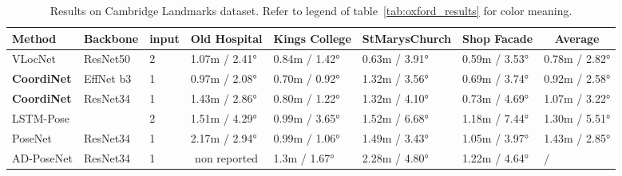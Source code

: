\documentclass[10pt,twocolumn,letterpaper]{article}
\begin{document}
\begin{table*}[!t]
\footnotesize
\centering

\caption{\label{tab:cambridge_results}Results on Cambridge Landmarks dataset. Refer to legend of table~\ref{tab:oxford_results} for color meaning.}

\vspace{0.4cm}

\begin{tabular}{|l|l|l|l|l|l|l|l|}
\hline
\textbf{Method}    & \textbf{Backbone} & \textbf{input} & \multicolumn{1}{c|}{\textbf{Old Hospital}} & \textbf{Kings College}                & \textbf{StMarysChurch}                & \textbf{Shop Facade}                  & \multicolumn{1}{c|}{\textbf{Average}} \\ \hline
VLocNet            & ResNet50          & 2              & 1.07m / 2.41°                              & 0.84m / 1.42°                         & \cellcolor[HTML]{92D050}0.63m / 3.91° & \cellcolor[HTML]{92D050}0.59m / 3.53° & \cellcolor[HTML]{92D050}0.78m / 2.82° \\ \hline
\rowcolor[HTML]{E7E6E6} 
\textbf{CoordiNet} & EffNet b3         & 1              & \cellcolor[HTML]{92D050}0.97m / 2.08°      & \cellcolor[HTML]{92D050}0.70m / 0.92° & 1.32m / 3.56° & 0.69m / 3.74°  & \cellcolor[HTML]{92D050}0.92m / 2.58° \\ \hline
\rowcolor[HTML]{E7E6E6} 
\textbf{CoordiNet} & ResNet34          & 1              & 1.43m / 2.86° & 0.80m / 1.22°                                & 1.32m / 4.10°                                 & 0.73m / 4.69°                                 &  1.07m / 3.22°                                      \\ \hline
LSTM-Pose          &                   & 2              & 1.51m / 4.29°                              & 0.99m / 3.65°                         & 1.52m / 6.68°                         & 1.18m / 7.44°                         & 1.30m / 5.51°                         \\ \hline
PoseNet            & ResNet34          & 1              & 2.17m / 2.94°                              & 0.99m / 1.06°                         & 1.49m / 3.43°                         & 1.05m / 3.97°                         & 1.43m / 2.85°                         \\ \hline
AD-PoseNet         & ResNet34          & 1              & \multicolumn{1}{c|}{non reported}          & 1.3m / 1.67°                          & 2.28m / 4.80°                         & 1.22m / 4.64°                         & /                                     \\ \hline

\end{tabular}
\end{table*}
\end{document}
